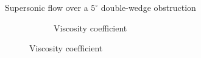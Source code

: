 \documentclass[xcolor=dvipsnames,10pt]{beamer}
\begin{document}
\begin{frame}{Supersonic flow over a $5^\circ$ double-wedge obstruction}
\begin{figure}
\begin{subfigure}[b]{0.45\textwidth}
                \caption{Viscosity coefficient}
        \end{subfigure}
\end{figure}
\end{frame}
\end{document}
